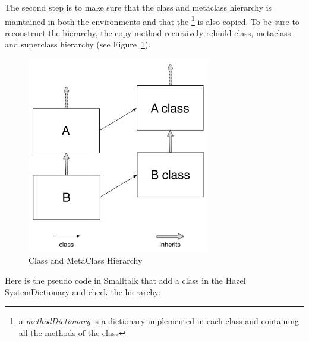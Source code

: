 The second step is to make sure that the class and metaclass hierarchy is maintained in both the environments and that the \footnote{a \emph{methodDictionary} is a dictionary implemented in each class and containing all the methods of the class} is also copied. To be sure to reconstruct the hierarchy, the copy method recursively rebuild class, metaclass and superclass hierarchy (see Figure~\ref{ClassMetaClassHierarchy}).

\begin{figure}[h]
	\centering\includegraphics[width = 8cm]{figures/ClassMetaClassHierarchy}
	\caption{Class and MetaClass Hierarchy}
	\label{ClassMetaClassHierarchy}
\end{figure}

	
Here is the pseudo code in Smalltalk that add a class in the Hazel SystemDictionary and check the hierarchy:
	
